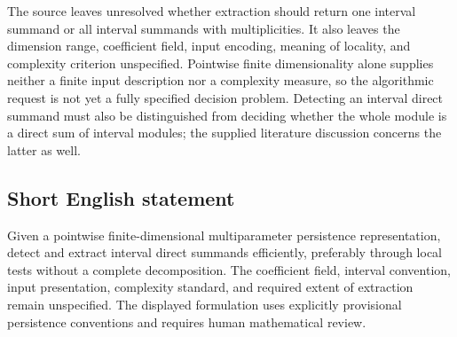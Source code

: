 \documentclass[11pt]{article}
\begin{document}
The source leaves unresolved whether extraction should return one interval summand or all interval summands with multiplicities. It also leaves the dimension range, coefficient field, input encoding, meaning of locality, and complexity criterion unspecified. Pointwise finite dimensionality alone supplies neither a finite input description nor a complexity measure, so the algorithmic request is not yet a fully specified decision problem. Detecting an interval direct summand must also be distinguished from deciding whether the whole module is a direct sum of interval modules; the supplied literature discussion concerns the latter as well.
\subsection{Short English statement}
Given a pointwise finite-dimensional multiparameter persistence representation, detect and extract interval direct summands efficiently, preferably through local tests without a complete decomposition. The coefficient field, interval convention, input presentation, complexity standard, and required extent of extraction remain unspecified. The displayed formulation uses explicitly provisional persistence conventions and requires human mathematical review.
\end{document}
